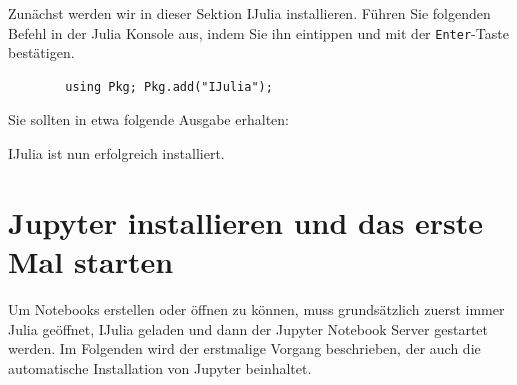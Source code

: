 \documentclass[11pt, a4paper]{scrartcl}
\begin{document}
	
	Zunächst werden wir in dieser Sektion IJulia installieren. Führen Sie folgenden Befehl in der Julia Konsole aus, indem Sie ihn eintippen und mit der \texttt{Enter}-Taste bestätigen.
	
	\begin{lstlisting}
		using Pkg; Pkg.add("IJulia");
	\end{lstlisting}

	Sie sollten in etwa folgende Ausgabe erhalten:
	
	\begin{figure}[h!]
	\centering
	\end{figure}

	IJulia ist nun erfolgreich installiert.
	
	
	
	
	
	
	
	
	
	
	
	
	\newpage
	\section{Jupyter installieren und das erste Mal starten}
	
	Um Notebooks erstellen oder öffnen zu können, muss grundsätzlich zuerst immer Julia geöffnet, IJulia geladen und dann der Jupyter Notebook Server gestartet werden. Im Folgenden wird der erstmalige Vorgang beschrieben, der auch die automatische Installation von Jupyter beinhaltet. 
	
\end{document}
